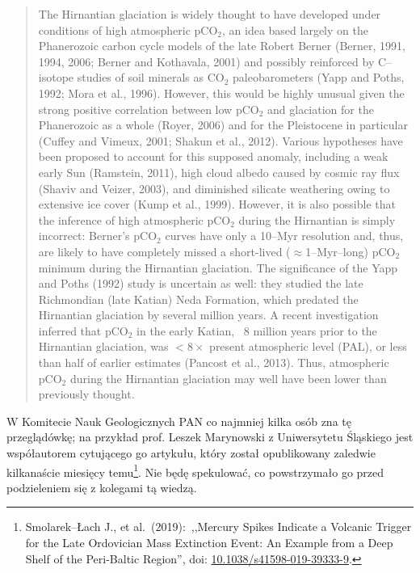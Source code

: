\documentclass[12pt]{article}
\newcommand{\doi}[1]{doi: \href{htts://doi.org/#1}{#1}}
\begin{document}
\begin{quotation}
The Hirnantian glaciation is widely thought to have developed under conditions of high atmospheric pCO$_2$, an idea based largely on the Phanerozoic carbon cycle models of the late Robert Berner (Berner, 1991, 1994, 2006; Berner and Kothavala, 2001) and possibly reinforced by C--isotope studies of soil minerals as CO$_2$ paleobarometers (Yapp and Poths, 1992; Mora et al., 1996). However, this would be highly unusual given the strong positive correlation between low pCO$_2$ and glaciation for the Phanerozoic as a whole (Royer, 2006) and for the Pleistocene in particular (Cuffey and Vimeux, 2001; Shakun et al., 2012). Various hypotheses have been proposed to account for this supposed anomaly, including a weak early Sun (Ramstein, 2011), high cloud albedo caused by cosmic ray flux (Shaviv and Veizer, 2003), and diminished silicate weathering owing to extensive ice cover (Kump et al., 1999). However, it is also possible that the inference of high atmospheric pCO$_2$ during the Hirnantian is simply incorrect: Berner's pCO$_2$ curves have only a 10--Myr resolution and, thus, are likely to have completely missed a short-lived ($\approx$1--Myr--long) pCO$_2$ minimum during the Hirnantian glaciation. The significance of the Yapp and Poths (1992) study is uncertain as well: they studied the late Richmondian (late Katian) Neda Formation, which predated the Hirnantian glaciation by several million years. A recent investigation inferred that pCO$_2$ in the early Katian, ~8 million years prior to the Hirnantian glaciation, was $<8\times$ present atmospheric level (PAL), or less than half of earlier estimates (Pancost et al., 2013). Thus, atmospheric pCO$_2$ during the Hirnantian glaciation may well have been lower than previously thought.	
\end{quotation}

		
W Komitecie Nauk Geologicznych PAN co najmniej kilka osób zna tę przeglądówkę; na przykład prof. Leszek Marynowski z Uniwersytetu Śląskiego jest współautorem cytującego go artykułu, który został opublikowany zaledwie kilkanaście miesięcy temu\footnote{Smolarek--Łach J., et al.~(2019):~,,Mercury Spikes Indicate a Volcanic Trigger for the Late Ordovician Mass Extinction Event: An Example from a Deep Shelf of the Peri-Baltic Region'', \doi{10.1038/s41598-019-39333-9}.}. Nie będę spekulować, co powstrzymało go przed podzieleniem się z kolegami tą wiedzą.
\end{document}
